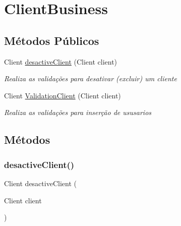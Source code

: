 \hypertarget{classBusiness_1_1ClientBusiness}{}\section{Client\+Business}
\label{classBusiness_1_1ClientBusiness}
\subsection*{Métodos Públicos}
\begin{DoxyCompactItemize}
\item 
Client \hyperlink{classBusiness_1_1ClientBusiness_afb681df27b3533da4cee4cce1eb4a548}{desactive\+Client} (Client client)
\begin{DoxyCompactList}\small\item\em Realiza as validações para desativar (excluir) um cliente \end{DoxyCompactList}\item 
Client \hyperlink{classBusiness_1_1ClientBusiness_a8342831feddce88564ead2ac46ea1550}{Validation\+Client} (Client client)
\begin{DoxyCompactList}\small\item\em Realiza as validações para inserção de ususarios \end{DoxyCompactList}\end{DoxyCompactItemize}


\subsection{Métodos}
\mbox{\label{classBusiness_1_1ClientBusiness_afb681df27b3533da4cee4cce1eb4a548}} 
\subsubsection{\texorpdfstring{desactive\+Client()}{desactiveClient()}}
{\footnotesize\ttfamily Client desactive\+Client (\begin{DoxyParamCaption}\item[{Client}]{client }\end{DoxyParamCaption})}



